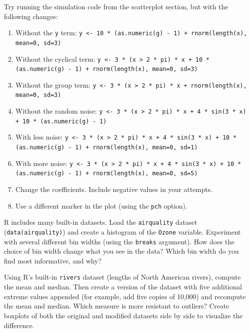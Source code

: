 \begin{exercise}
Try running the simulation code from the scatterplot section, but with the
following changes:
\begin{enumerate}
\item Without the \lstinline{y} term: \lstinline{y <- 10 * (as.numeric(g) - 1) + rnorm(length(x), mean=0, sd=3)}
\item Without the cyclical term: \lstinline{y <- 3 * (x > 2 * pi) * x + 10 * (as.numeric(g) - 1) + rnorm(length(x), mean=0, sd=3)}
\item Without the group term: \lstinline{y <- 3 * (x > 2 * pi) * x + rnorm(length(x), mean=0, sd=3)}
\item Without the random noise: \lstinline{y <- 3 * (x > 2 * pi) * x + 4 * sin(3 * x) + 10 * (as.numeric(g) - 1)}
\item With less noise: \lstinline{y <- 3 * (x > 2 * pi) * x + 4 * sin(3 * x) + 10 * (as.numeric(g) - 1) + rnorm(length(x), mean=0, sd=1)}
\item With more noise: \lstinline{y <- 3 * (x > 2 * pi) * x + 4 * sin(3 * x) + 10 * (as.numeric(g) - 1) + rnorm(length(x), mean=0, sd=5)}
\item Change the coefficients. Include negative values in your attempts.
\item Use a different marker in the plot (using the \lstinline{pch} option).
\end{enumerate}
\end{exercise}

\begin{exercise}
R includes many built-in datasets. Load the \lstinline{airquality} dataset
(\lstinline{data(airquality)}) and create a histogram of the \lstinline{Ozone}
variable. Experiment with several different bin widths (using the \lstinline{breaks}
argument). How does the choice of bin width change what you see in the data?
Which bin width do you find most informative, and why?
\end{exercise}

\begin{exercise}
Using R's built-in \lstinline{rivers} dataset (lengths of North American rivers),
compute the mean and median. Then create a version of the dataset with five
additional extreme values appended (for example, add five copies of 10{,}000) and
recompute the mean and median. Which measure is more resistant to outliers?
Create boxplots of both the original and modified datasets side by side
to visualize the difference.
\end{exercise}

